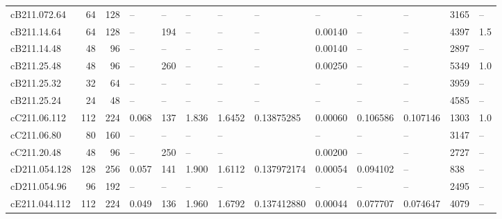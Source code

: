 \documentclass[a4paper,11pt]{article}
\begin{document}
\begin{table}
{\begin{tabular}{lrrllllllllll}
      cB211.072.64      & 64    & 128   & --            & --                 & --      & --     & --          & --          & --            & --            & 3165              & --     \\
      cB211.14.64       & 64    & 128   & --            & 194                & --      & --     & --          & 0.00140     & --            & --            & 4397              & 1.5    \\
      cB211.14.48       & 48    & 96    & --            & --                 & --      & --     & --          & 0.00140     & --            & --            & 2897              & --     \\
      cB211.25.48       & 48    & 96    & --            & 260                & --      & --     & --          & 0.00250     & --            & --            & 5349              & 1.0    \\
      cB211.25.32       & 32    & 64    & --            & --                 & --      & --     & --          & --          & --            & --            & 3959              & --     \\
      cB211.25.24       & 24    & 48    & --            & --                 & --      & --     & --          & --          & --            & --            & 4585              & --     \\ \hline
      cC211.06.112      & 112   & 224   & 0.068         & 137                & 1.836   & 1.6452 & 0.13875285  & 0.00060     & 0.106586      & 0.107146      & 1303              & 1.0    \\
      cC211.06.80       & 80    & 160   & --            & --                 & --      & --     &             & --          & --            & --            & 3147              & --     \\
      cC211.20.48       & 48    & 96    & --            & 250                & --      & --     &             & 0.00200     & --            & --            & 2727              & --     \\ \hline
      cD211.054.128     & 128   & 256   & 0.057         & 141                & 1.900   & 1.6112 & 0.137972174 & 0.00054     & 0.094102      & --            & 838               & --     \\
      cD211.054.96      & 96    & 192   & --            & --                 & --      & --     &             & --          & --            & --            & 2495              & --     \\ \hline
      cE211.044.112     & 112   & 224   & 0.049         & 136                & 1.960   & 1.6792 & 0.137412880 & 0.00044     & 0.077707      & 0.074647      & 4079              & --     \\ \hline

\end{tabular}}
\end{table}
\end{document}
